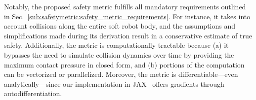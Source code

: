 Notably, the proposed safety metric fulfills all mandatory requirements outlined in Sec.~\ref{sub:safetymetric:safety_metric_requirements}. For instance, it takes into account collisions along the entire soft robot body, and the assumptions and simplifications made during its derivation result in a conservative estimate of true safety. Additionally, the metric is computationally tractable because (a) it bypasses the need to simulate collision dynamics over time by providing the maximum contact pressure in closed form, and (b) portions of the computation can be vectorized or parallelized. Moreover, the metric is differentiable—even analytically—since our implementation in JAX~\citep{jax2018github} offers gradients through autodifferentiation.


